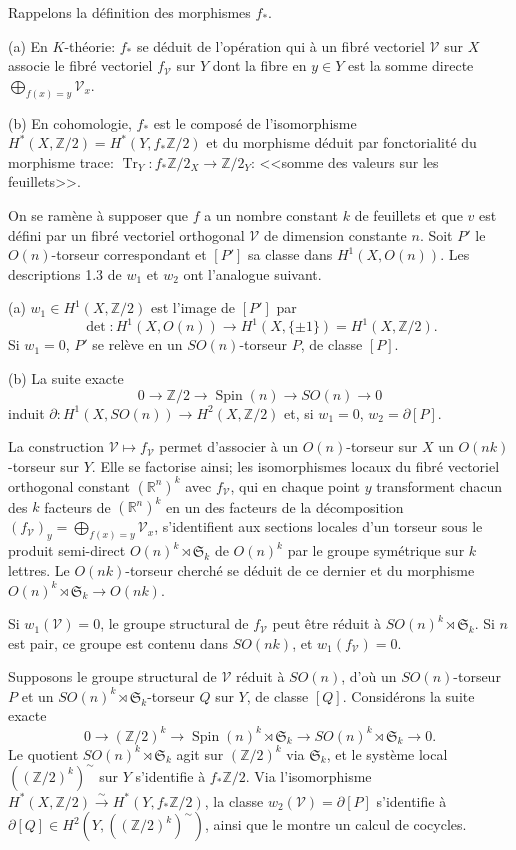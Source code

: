 \documentclass[11pt]{amsart}
\theoremstyle{plain}
\theoremstyle{definition}
\DeclareMathOperator{\Tr}{Tr}
\DeclareMathOperator{\Spin}{Spin}
\newcommand{\R}{\mathbb{R}}
\newcommand{\Z}{\mathbb{Z}}
\begin{document}
Rappelons la d\'efinition des morphismes $f_*$.

(a) En $K$-th\'eorie: $f_*$ se d\'eduit de l'op\'eration qui \`a un fibr\'e vectoriel $\mathscr{V}$ sur $X$ associe le fibr\'e vectoriel $f_\mathscr{V}$ sur $Y$ dont la fibre en $y\in Y$ est la somme directe $\bigoplus_{f(x)=y}\mathscr{V}_x$.

(b) En cohomologie, $f_*$ est le compos\'e de l'isomorphisme $H^*(X,\Z/2)=H^*(Y,f_*\Z/2)$ et du morphisme d\'eduit par fonctorialit\'e du morphisme trace: $\Tr_Y\colon f_*\Z/2_X\to\Z/2_Y$: <<somme des valeurs sur les feuillets>>.

On se ram\`ene \`a supposer que $f$ a un nombre constant $k$ de feuillets et que $v$ est d\'efini par un fibr\'e vectoriel orthogonal $\mathscr{V}$ de dimension constante $n$. Soit $P'$ le $O(n)$-torseur correspondant et $[P']$ sa classe dans $H^1(X,O(n))$. Les descriptions 1.3 de $w_1$ et $w_2$ ont l'analogue suivant.

(a) $w_1\in H^1(X,\Z/2)$ est l'image de $[P']$ par
\[
\det\colon H^1(X,O(n))\longrightarrow H^1(X,\{\pm1\})=H^1(X,\Z/2).
\]
Si $w_1=0$, $P'$ se rel\`eve en un $SO(n)$-torseur $P$, de classe $[P]$.

(b) La suite exacte
\[
0\longrightarrow\Z/2\longrightarrow\Spin(n)\longrightarrow SO(n)\longrightarrow 0
\]
induit $\partial\colon H^1(X,SO(n))\to H^2(X,\Z/2)$ et, si $w_1=0$, $w_2=\partial[P]$.

La construction $\mathscr{V}\mapsto f_\mathscr{V}$ permet d'associer \`a un $O(n)$-torseur sur $X$ un $O(nk)$-torseur sur $Y$. Elle se factorise ainsi; les isomorphismes locaux du fibr\'e vectoriel orthogonal constant $(\R^n)^k$ avec $f_\mathscr{V}$, qui en chaque point $y$ transforment chacun des $k$ facteurs de $(\R^n)^k$ en un des facteurs de la d\'ecomposition $(f_\mathscr{V})_y=\bigoplus_{f(x)=y}\mathscr{V}_x$, s'identifient aux sections locales d'un torseur sous le produit semi-direct $O(n)^k\rtimes\mathfrak{S}_k$ de $O(n)^k$ par le groupe sym\'etrique sur $k$ lettres. Le $O(nk)$-torseur cherch\'e se d\'eduit de ce dernier et du morphisme $O(n)^k\rtimes\mathfrak{S}_k\to O(nk)$.

Si $w_1(\mathscr{V})=0$, le groupe structural de $f_\mathscr{V}$ peut \^etre r\'eduit \`a $SO(n)^k\rtimes\mathfrak{S}_k$. Si $n$ est pair, ce groupe est contenu dans $SO(nk)$, et $w_1(f_\mathscr{V})=0$.

Supposons le groupe structural de $\mathscr{V}$ r\'eduit \`a $SO(n)$, d'o\`u un $SO(n)$-torseur $P$ et un $SO(n)^k\rtimes\mathfrak{S}_k$-torseur $Q$ sur $Y$, de classe $[Q]$. Consid\'erons la suite exacte
\[
0\longrightarrow(\Z/2)^k\longrightarrow\Spin(n)^k\rtimes\mathfrak{S}_k\longrightarrow SO(n)^k\rtimes\mathfrak{S}_k\longrightarrow 0.
\]
Le quotient $SO(n)^k\rtimes\mathfrak{S}_k$ agit sur $(\Z/2)^k$ via $\mathfrak{S}_k$, et le syst\`eme local $((\Z/2)^k)^\sim$ sur $Y$ s'identifie \`a $f_*\Z/2$. Via l'isomorphisme $H^*(X,\Z/2)\xrightarrow{\sim}H^*(Y,f_*\Z/2)$, la classe $w_2(\mathscr{V})=\partial[P]$ s'identifie \`a $\partial[Q]\in H^2(Y,((\Z/2)^k)^\sim)$, ainsi que le montre un calcul de cocycles.
\end{document}
